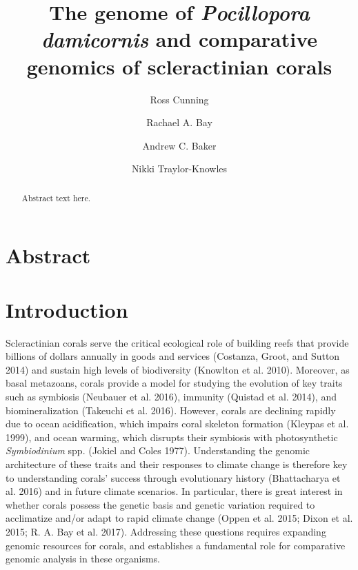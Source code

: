 \documentclass[]{elsarticle} %
\begin{document}
\begin{frontmatter}

  \title{The genome of \emph{Pocillopora damicornis} and comparative genomics of
scleractinian corals}
    \author[RSMAS]{Ross Cunning}
    \author[UCLA]{Rachael A. Bay}
  
  
    \author[RSMAS]{Andrew C. Baker}
  
  
    \author[RSMAS]{Nikki Traylor-Knowles}
  
  
      \address[RSMAS]{Department of Marine Biology and Ecology, Rosenstiel School of Marine
and Atmospheric Science, University of Miami, Miami, FL 33149, USA}
    \address[UCLA]{Institute for the Environment and Sustainability, University of
California, Los Angeles, Los Angeles, CA 90095, USA}
  
  \begin{abstract}
  Abstract text here.
  \end{abstract}
  
 \end{frontmatter}

\section{Abstract}\label{abstract}

\section{Introduction}\label{introduction}

Scleractinian corals serve the critical ecological role of building
reefs that provide billions of dollars annually in goods and services
(Costanza, Groot, and Sutton 2014) and sustain high levels of
biodiversity (Knowlton et al. 2010). Moreover, as basal metazoans,
corals provide a model for studying the evolution of key traits such as
symbiosis (Neubauer et al. 2016), immunity (Quistad et al. 2014), and
biomineralization (Takeuchi et al. 2016). However, corals are declining
rapidly due to ocean acidification, which impairs coral skeleton
formation (Kleypas et al. 1999), and ocean warming, which disrupts their
symbiosis with photosynthetic \emph{Symbiodinium} spp. (Jokiel and Coles
1977). Understanding the genomic architecture of these traits and their
responses to climate change is therefore key to understanding corals'
success through evolutionary history (Bhattacharya et al. 2016) and in
future climate scenarios. In particular, there is great interest in
whether corals possess the genetic basis and genetic variation required
to acclimatize and/or adapt to rapid climate change (Oppen et al. 2015;
Dixon et al. 2015; R. A. Bay et al. 2017). Addressing these questions
requires expanding genomic resources for corals, and establishes a
fundamental role for comparative genomic analysis in these organisms.
\end{document}
